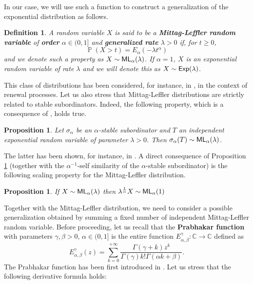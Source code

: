 \documentclass[]{amsart}
\numberwithin{equation}{section}
\newtheorem{defn}{Definition}[section]
\newtheorem{prop}[thm]{Proposition}
\theoremstyle{remark}
\theoremstyle{definition}
\DeclareMathOperator{\bP}{\mathbb{P}}
\begin{document}
In our case, we will use such a function to construct a generalization of the exponential distribution as follows.
\begin{defn}
	A random variable $X$ is said to be a \textbf{Mittag-Leffler random variable} of \textbf{order} $\alpha \in (0,1]$ and \textbf{generalized rate} $\lambda>0$ if, for $t \ge 0$,
	\begin{equation*}
		\bP(X>t)=E_\alpha(-\lambda t^\alpha)
	\end{equation*}
	and we denote such a property as $X \sim {\sf ML}_\alpha(\lambda)$. If $\alpha=1$, $X$ is an exponential random variable of rate $\lambda$ and we will denote this as $X \sim {\sf Exp}(\lambda)$.
\end{defn}
This class of distributions has been considered, for instance, in \cite{mainardi2004fractional,mainardi2005renewal}, in the context of renewal processes. Let us also stress that Mittag-Leffler distributions are strictly related to stable subordinators. Indeed, the following property, which is a consequence of \cite{bingham1971limit}, holds true.
\begin{prop}\label{eq:sigma}
	Let $\sigma_\alpha$ be an $\alpha$-stable subordinator and $T$ an independent exponential random variable of parameter $\lambda>0$. Then $\sigma_\alpha(T)\sim {\sf ML}_\alpha(\lambda)$.
\end{prop}
The latter has been shown, for instance, in \cite[Lemma 2]{ascione2022skorokhod}. A direct consequence of Proposition \ref{eq:sigma} (together with the $\alpha^{-1}$-self similarity of the $\alpha$-stable subordinator) is the following scaling property for the Mittag-Leffler distribution.
\begin{prop}\label{prop:scalingML}
	If $X \sim {\sf ML}_\alpha(\lambda)$ then $\lambda^{\frac{1}{\alpha}}X\sim {\sf ML}_\alpha(1)$
\end{prop}
Together with the Mittag-Leffler distribution, we need to consider a possible generalization obtained by summing a fixed number of independent Mittag-Leffler random variable. Before proceeding, let us recall that the \textbf{Prabhakar function} with parameters $\gamma,\beta>0$, $\alpha \in (0,1]$ is the entire function $E_{\alpha,\beta}^{\gamma}:\mathbb{C} \to \mathbb{C}$ defined as
\begin{equation*}
	E_{\alpha,\beta}^{\gamma}(z)=\sum_{k=0}^{+\infty}\frac{\Gamma(\gamma+k)z^k}{\Gamma(\gamma)k!\Gamma(\alpha k+\beta)}.
\end{equation*}
The Prabhakar function has been first introduced in \cite{prabhakar1971singular}. Let us stress that the following derivative formula holds:
\end{document}
